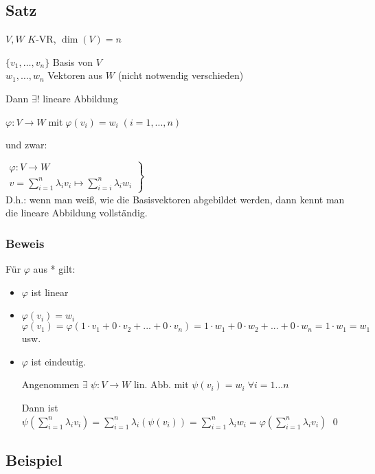\subsection{Satz}

$V,W$ $K$-VR, $\dim(V)=n$

$\{v_1, \dots, v_n\}$ Basis von $V$ \\
$w_1,\dots, w_n $ Vektoren aus $W$ (nicht notwendig verschieden)

Dann $\exists!$ lineare Abbildung



$\varphi: V \rightarrow W \;$mit$\; \varphi(v_i) = w_i \; (i=1,...,n)$

und zwar: 

$\left.
\begin{array}{l}
\varphi: V \rightarrow W\\
v=\sum_{i=1}^{n} \lambda_i v_i \mapsto \sum_{i=i}^{n} \lambda_i w_i
\end{array}
\right\rbrace$\huge*\normalsize\\

D.h.: wenn man weiß, wie die Basisvektoren abgebildet werden, dann kennt man die lineare Abbildung vollständig.

\subsubsection*{Beweis}
Für $\varphi$ aus * gilt:
\begin{itemize}
	\item $\varphi$ ist linear
	\item $\varphi(v_i) = w_i$\\
	$\varphi(v_1)=\varphi(1\cdot v_1 + 0 \cdot v_2 + ... + 0 \cdot v_n) = 1 \cdot w_1 + 0 \cdot w_2 + ... + 0 \cdot w_n = 1 \cdot w_1 = w_1$ usw.
	\item $\varphi$ ist eindeutig.
	
	Angenommen $\exists \;\psi: V \rightarrow W$ lin. Abb. mit $\psi(v_i) = w_i \; \forall i=1...n$
	
	Dann ist $\psi(\sum_{i=1}^{n} \lambda_i v_i) = \sum_{i=1}^{n} \lambda_i(\psi(v_i)) = \sum_{i=1}^{n} \lambda_i w_i = \varphi(\sum_{i=1}^{n} \lambda_i v_i) $
	\qed
\end{itemize}

\subsection{Beispiel}
\label{beispiel:drehung}

